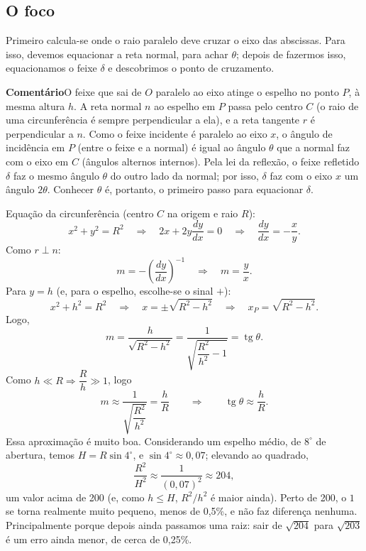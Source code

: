 \documentclass[11pt,a4paper]{article}
\DeclareMathOperator{\tg}{tg}
\newcommand{\titulocaixa}[1]{{\sffamily\bfseries\color{caixatitulo}#1}}
\begin{document}
\subsection*{O foco}
Primeiro calcula-se onde o raio paralelo deve cruzar o eixo
das abscissas. Para isso, devemos equacionar a reta normal, para achar $\theta$;
depois de fazermos isso, equacionamos o feixe $\delta$ e descobrimos o ponto de
cruzamento.

\begin{comentario}
  \titulocaixa{Comentário}\quad O feixe que sai de $O$ paralelo ao eixo atinge o
  espelho no ponto $P$, à mesma altura $h$. A reta normal $n$ ao espelho em $P$
  passa pelo centro $C$ (o raio de uma circunferência é sempre perpendicular a
  ela), e a reta tangente $r$ é perpendicular a $n$. Como o feixe incidente é
  paralelo ao eixo $x$, o ângulo de incidência em $P$ (entre o feixe e a normal)
  é igual ao ângulo $\theta$ que a normal faz com o eixo em $C$ (ângulos
  alternos internos). Pela lei da reflexão, o feixe refletido $\delta$ faz o
  mesmo ângulo $\theta$ do outro lado da normal; por isso, $\delta$ faz com o
  eixo $x$ um ângulo $2\theta$. Conhecer $\theta$ é, portanto, o primeiro passo
  para equacionar $\delta$.
\end{comentario}

Equação da circunferência (centro $C$ na origem e raio $R$):
\begin{equation}\label{eq:circ}
  x^2 + y^2 = R^2 \quad\Longrightarrow\quad 2x + 2y\frac{dy}{dx} = 0
  \quad\Longrightarrow\quad \frac{dy}{dx} = -\frac{x}{y}.
\end{equation}
Como $r \perp n$:
\begin{equation}\label{eq:normal}
  m = -\left(\frac{dy}{dx}\right)^{-1} \quad\Longrightarrow\quad m = \frac{y}{x}.
\end{equation}
Para $y = h$ (e, para o espelho, escolhe-se o sinal $+$):
\begin{equation}\label{eq:xP}
  x^2 + h^2 = R^2 \quad\Longrightarrow\quad x = \pm\sqrt{R^2 - h^2}
  \quad\Longrightarrow\quad x_P = \sqrt{R^2 - h^2}.
\end{equation}
Logo,
\begin{equation}\label{eq:m}
  m = \frac{h}{\sqrt{R^2 - h^2}} = \frac{1}{\sqrt{\dfrac{R^2}{h^2} - 1}} = \tg\theta.
\end{equation}
Como $h \ll R \Rightarrow \dfrac{R}{h} \gg 1$, logo
\begin{equation}\label{eq:aprox}
  m \approx \frac{1}{\sqrt{\dfrac{R^2}{h^2}}} = \frac{h}{R}
  \qquad\Longrightarrow\qquad \tg\theta \approx \frac{h}{R}.
\end{equation}
Essa aproximação é muito boa. Considerando um espelho médio, de $8^\circ$ de
abertura, temos $H = R\sin 4^\circ$, e $\sin 4^\circ \approx 0{,}07$; elevando ao
quadrado,
\[
  \frac{R^2}{H^2} \approx \frac{1}{(0{,}07)^2} \approx 204,
\]
um valor acima de 200 (e, como $h \le H$, $R^2/h^2$ é maior ainda). Perto de 200,
o $1$ se torna realmente muito pequeno, menos de 0,5\%, e não faz diferença
nenhuma. Principalmente porque depois ainda passamos uma raiz: sair de
$\sqrt{204}$ para $\sqrt{203}$ é um erro ainda menor, de cerca de 0,25\%.
\end{document}
